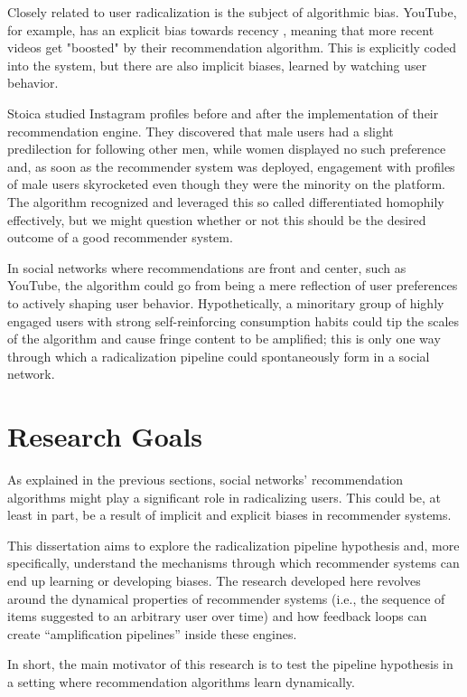 Closely related to user radicalization is the subject of algorithmic bias.
YouTube, for example, has an explicit bias towards recency
\citep{covington_deep_2016}, meaning that more recent videos get "boosted" by
their recommendation algorithm. This is explicitly coded into the system, but
there are also implicit biases, learned by watching user behavior.

Stoica \citep{stoica_algorithmic_2018} studied Instagram profiles before and
after the implementation of their recommendation engine. They discovered that
male users had a slight predilection for following other men, while women
displayed no such preference and, as soon as the recommender system was
deployed, engagement with profiles of male users skyrocketed even though they
were the minority on the platform. The algorithm recognized and leveraged this
so called differentiated homophily effectively, but we might question whether or
not this should be the desired outcome of a good recommender system.

In social networks where recommendations are front and center, such as YouTube,
the algorithm could go from being a mere reflection of user preferences to
actively shaping user behavior. Hypothetically, a minoritary group of highly
engaged users with strong self-reinforcing consumption habits could tip the
scales of the algorithm and cause fringe content to be amplified; this is only
one way through which a radicalization pipeline could spontaneously form in a
social network.

\section{Research Goals}
\label{sec:research_goals}

As explained in the previous sections, social networks' recommendation
algorithms might play a significant role in radicalizing users. This could be,
at least in part, be a result of implicit and explicit biases in recommender
systems.

This dissertation aims to explore the radicalization pipeline hypothesis and,
more specifically, understand the mechanisms through which recommender systems
can end up learning or developing biases. The research developed here revolves
around the dynamical properties of recommender systems (i.e., the sequence of
items suggested to an arbitrary user over time) and how feedback loops can
create ``amplification pipelines'' inside these engines.

In short, the main motivator of this research is to test the pipeline hypothesis
in a setting where recommendation algorithms learn dynamically.

